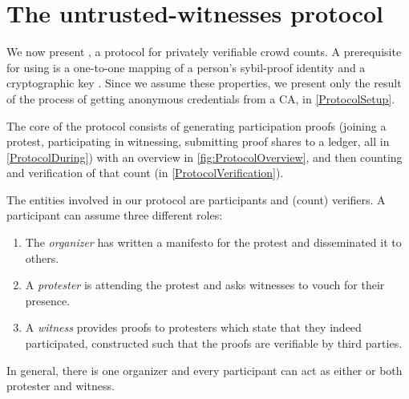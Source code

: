 \section{The untrusted-witnesses protocol}%
\label{untrusted-witnesses-protocol}


We now present \CROCUS, a protocol for privately verifiable crowd
counts. A prerequisite for using \CROCUS is a one-to-one mapping of a person's
sybil-proof identity and a cryptographic key%
. Since we assume these properties, we
present only the result of the process of getting anonymous
credentials from a \ac{CA}, in \cref{ProtocolSetup}.

The core of the \CROCUS protocol consists of generating participation
proofs (joining a protest, participating in witnessing, submitting
proof shares to a ledger, all in \cref{ProtocolDuring}) with an overview in \cref{fig:ProtocolOverview}, and then counting and
verification of that count (in \cref{ProtocolVerification}). 


The entities involved in our protocol are participants and (count) verifiers.
A participant can assume three different roles:
\begin{enumerate}
\item The \emph{organizer} has written a manifesto for the protest and 
  disseminated it to others.
\item A \emph{protester} is attending the protest and asks witnesses to vouch 
  for their presence.
\item A \emph{witness} provides proofs to protesters which state that they indeed participated, constructed such that the proofs are verifiable by 
  third parties.
\end{enumerate}
In general, there is one organizer and every participant can act as
either or both protester and witness.

